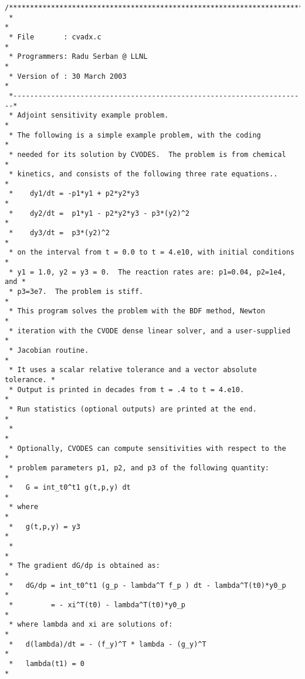 \begin{verbatim}
/************************************************************************
 *                                                                      *
 * File       : cvadx.c                                                 *
 * Programmers: Radu Serban @ LLNL                                      *
 * Version of : 30 March 2003                                           *
 *----------------------------------------------------------------------*
 * Adjoint sensitivity example problem.                                 *
 * The following is a simple example problem, with the coding           *
 * needed for its solution by CVODES.  The problem is from chemical     *
 * kinetics, and consists of the following three rate equations..       *
 *    dy1/dt = -p1*y1 + p2*y2*y3                                        *
 *    dy2/dt =  p1*y1 - p2*y2*y3 - p3*(y2)^2                            *
 *    dy3/dt =  p3*(y2)^2                                               *
 * on the interval from t = 0.0 to t = 4.e10, with initial conditions   *
 * y1 = 1.0, y2 = y3 = 0.  The reaction rates are: p1=0.04, p2=1e4, and *
 * p3=3e7.  The problem is stiff.                                       *
 * This program solves the problem with the BDF method, Newton          *
 * iteration with the CVODE dense linear solver, and a user-supplied    *
 * Jacobian routine.                                                    * 
 * It uses a scalar relative tolerance and a vector absolute tolerance. *
 * Output is printed in decades from t = .4 to t = 4.e10.               *
 * Run statistics (optional outputs) are printed at the end.            *
 *                                                                      *
 * Optionally, CVODES can compute sensitivities with respect to the     *
 * problem parameters p1, p2, and p3 of the following quantity:         *
 *   G = int_t0^t1 g(t,p,y) dt                                          *
 * where                                                                *
 *   g(t,p,y) = y3                                                      *
 *                                                                      *
 * The gradient dG/dp is obtained as:                                   *
 *   dG/dp = int_t0^t1 (g_p - lambda^T f_p ) dt - lambda^T(t0)*y0_p     *
 *         = - xi^T(t0) - lambda^T(t0)*y0_p                             *
 * where lambda and xi are solutions of:                                *
 *   d(lambda)/dt = - (f_y)^T * lambda - (g_y)^T                        *
 *   lambda(t1) = 0                                                     *

\end{verbatim}
